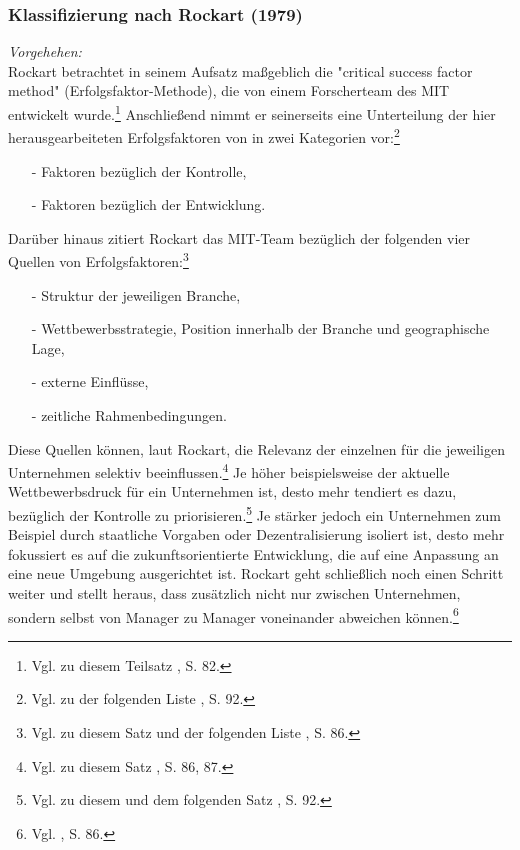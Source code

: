 \noindent
\subsubsection{Klassifizierung nach Rockart (1979)}
\textit{Vorgehehen:}\\\noindent
Rockart betrachtet in seinem Aufsatz maßgeblich die "critical success factor method" (Er\-folgs\-fak\-tor-\-Me\-tho\-de), die von einem Forscherteam des \ac{MIT} entwickelt wurde.\footnote{Vgl. zu diesem Teilsatz \cite{Rockart.1979}, S. 82.} Anschließend nimmt er seinerseits eine Unterteilung der  
hier herausgearbeiteten Erfolgsfaktoren von \ISPS in zwei Kategorien vor:\footnote{Vgl. zu der folgenden Liste \cite{Rockart.1979}, S. 92.}
\begin{itemize}\itemsep0pt
\item[-]Faktoren bezüglich der Kontrolle,
\item[-]Faktoren bezüglich der Entwicklung.
\end{itemize}
Darüber hinaus zitiert Rockart das MIT-Team bezüglich der folgenden vier Quellen von Erfolgsfaktoren:\footnote{Vgl. zu diesem Satz und der folgenden Liste \cite{Rockart.1979}, S. 86.}
\begin{itemize}\itemsep0pt
\item[-]Struktur der jeweiligen Branche,
\item[-]Wettbewerbsstrategie, Position innerhalb der Branche und geographische Lage,
\item[-]externe Einflüsse,
\item[-]zeitliche Rahmenbedingungen.
\end{itemize} 
Diese Quellen können, laut Rockart, die Relevanz der einzelnen \EF für die jeweiligen Unternehmen selektiv beeinflussen.\footnote{Vgl. zu diesem Satz \cite{Rockart.1979}, S. 86, 87.}
Je höher beispielsweise der aktuelle Wettbewerbsdruck für ein Unternehmen ist, desto mehr tendiert es dazu, \EF bezüglich der Kontrolle zu 
priorisieren.\footnote{Vgl. zu diesem und dem folgenden Satz \cite{Rockart.1979}, S. 92.}
Je stärker jedoch ein Unternehmen zum Beispiel durch staatliche Vorgaben oder Dezentralisierung isoliert ist, desto mehr fokussiert es auf die zukunftsorientierte 
Entwicklung, die auf eine Anpassung an eine neue Umgebung ausgerichtet ist. Rockart geht schließlich noch einen Schritt weiter und stellt heraus, 
dass \EF zusätzlich nicht nur zwischen Unternehmen, sondern selbst von Manager zu Manager voneinander abweichen können.\footnote{Vgl. \cite{Rockart.1979}, S. 86.} 
\\\noindent
